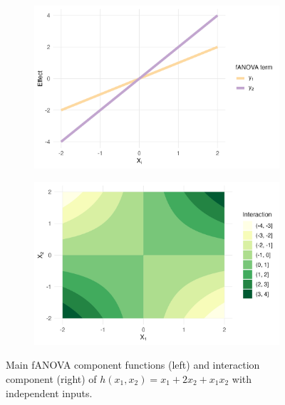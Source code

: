 \begin{figure}[htpb]
    \centering
    \begin{subfigure}[t]{0.49\textwidth}
        \centering
        \includegraphics[width=\textwidth]{images/experiment_section/running_example_a1p10_a2p20_a11p00_a22p00_a12p10_rhop00_main.png}
    \end{subfigure}%
    \hfill
    \begin{subfigure}[t]{0.49\textwidth}
        \centering
        \includegraphics[width=\textwidth]{images/experiment_section/running_example_a1p10_a2p20_a11p00_a22p00_a12p10_rhop00_interaction.png}
    \end{subfigure}
    \caption{Main fANOVA component functions (left) and interaction component (right) of $h(x_1, x_2) = x_1 + 2 x_2 + x_1 x_2$ with independent inputs.}
    \label{fig:running_ex_independent}
\end{figure}
